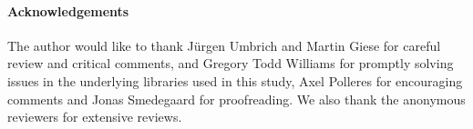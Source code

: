 \documentclass{llncs}
\begin{document}
\paragraph*{Acknowledgements} The author would like to thank Jürgen
Umbrich and Martin Giese for careful review and critical comments, and
Gregory Todd Williams for promptly solving issues in the underlying
libraries used in this study, Axel Polleres for encouraging comments
and Jonas Smedegaard for proofreading. We also thank the anonymous
reviewers for extensive reviews.


%
%
%

\end{document}
